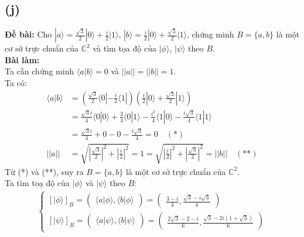 \subsection{(j)}
\textbf{Đề bài:} Cho $|a\rangle=\frac{\sqrt{3}}{2}|0\rangle+\frac{i}{2}|1\rangle$, $|b\rangle=\frac{i}{2}|0\rangle+\frac{\sqrt{3}}{2}|1\rangle$, chứng minh $B=\{a,b\}$ là một cơ sở trực chuẩn của $\mathbb{C}^{2}$ và tìm tọa độ của $|\phi\rangle$, $|\psi\rangle$ theo $B$.\\
\textbf{Bài làm:}\\
Ta cần chứng minh $\langle a|b\rangle=0$ và $||a||=||b||=1$.\\
Ta có:
\begin{align*}
    \langle a|b\rangle &= \left(\frac{\sqrt{3}}{2}\langle0| - \frac{i}{2}\langle1|\right)\left(\frac{i}{2}|0\rangle + \frac{\sqrt{3}}{2}|1\rangle\right)\\
    &= \frac{\sqrt{3}i}{4}\langle0|0\rangle + \frac{3}{4}\langle0|1\rangle - \frac{i^{2}}{4}\langle1|0\rangle - \frac{i\sqrt{3}}{4}\langle1|1\rangle\\
    &= \frac{\sqrt{3}i}{4} + 0 - 0 - \frac{i\sqrt{3}}{4} = 0 \quad (\text{*})\\
    ||a|| &= \sqrt{\left|\frac{\sqrt{3}}{2}\right|^2 + \left|\frac{i}{2}\right|^2} = 1 = \sqrt{\left|\frac{i}{2}\right|^2 + \left|\frac{\sqrt{3}}{2}\right|^2} = ||b|| \quad (\text{**})
\end{align*}
Từ (*) và (**), suy ra $B=\{a,b\}$ là một cơ sở trực chuẩn của $\mathbb{C}^{2}$.\\
Ta tìm toạ độ của $|\phi\rangle$ và $|\psi\rangle$ theo $B$:
\begin{align*}
    \begin{cases}
        [|\phi\rangle]_{B} = \begin{pmatrix}
            \langle a|\phi\rangle,
            \langle b|\phi\rangle
        \end{pmatrix} = \begin{pmatrix}
            \frac{3 - i}{4},
            \frac{\sqrt{3} - i\sqrt{3}}{4}
        \end{pmatrix}\\
        [|\psi\rangle]_{B} = \begin{pmatrix}
            \langle a|\psi\rangle,
            \langle b|\psi\rangle
        \end{pmatrix} = \begin{pmatrix}
            \frac{2\sqrt{3} - 2 - i}{6},
            \frac{\sqrt{3} - 2i(1 + \sqrt{3})}{6}
        \end{pmatrix}
    \end{cases}
\end{align*}

